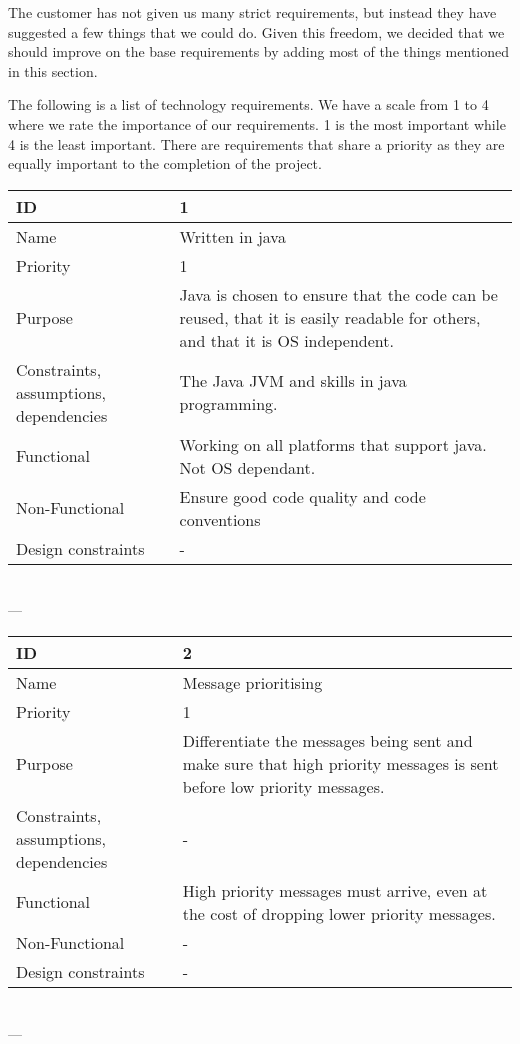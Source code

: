    The customer has not given us many strict requirements, but instead they have suggested a few things that we could do. Given this freedom, we decided that we should improve on the base requirements by adding most of the things mentioned in this section. 

    The following is a list of technology requirements. We have a scale from 1 to 4 where we rate the importance of our requirements. 1 is the most important while 4 is the least important. There are requirements that share a priority as they are equally important to the completion of the project. 

\begin{center}
    \begin{tabular}{| p{4cm} | p{8cm} |}
        \hline
        ID & 1 \\
        \hline
        Name & Written in java  \\
        \hline
        Priority & 1 \\
        \hline
        Purpose & Java is chosen to ensure that the code can be reused, that it is easily readable for others, and that it is OS independent. \\
        \hline 
        Constraints, assumptions, dependencies & The Java JVM and skills in java programming. \\
        \hline  
        Functional & Working on all platforms that support java. Not OS dependant. \\
        \hline
        Non-Functional & Ensure good code quality and code conventions \\ 
        \hline
        Design constraints & - \\
        \hline
    \end{tabular}
    \\  ---  \\
    
    \begin{tabular}{| p{4cm} | p{8cm} |}
        \hline
        ID & 2 \\
        \hline
        Name & Message prioritising \\
        \hline
        Priority & 1 \\
        \hline
        Purpose & Differentiate the messages being sent and make sure that high priority messages is sent before low priority messages. \\
        \hline 
        Constraints, assumptions, dependencies & -\\
        \hline  
        Functional & High priority messages must arrive, even at the cost of dropping lower priority messages.  \\
        \hline
        Non-Functional & - \\ 
        \hline
        Design constraints & - \\
        \hline
    \end{tabular}
    \\  ---  \\


\end{center}
